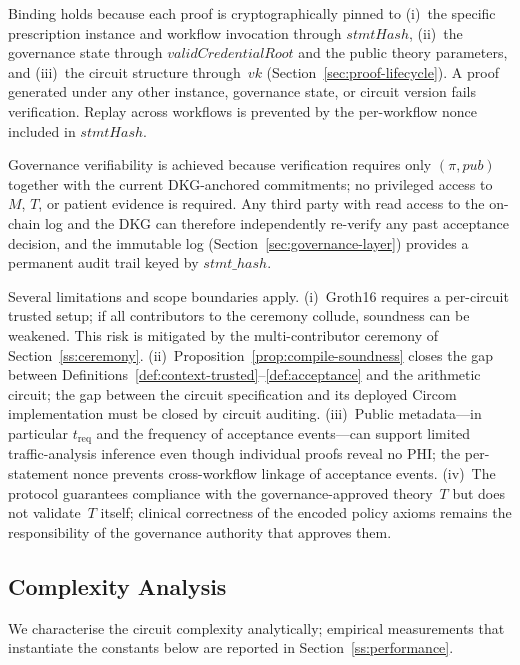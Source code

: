 \documentclass[journal]{IEEEtran}
\begin{document}
Binding holds because each proof is cryptographically pinned to
(i)~the specific prescription instance and workflow invocation
through $\mathit{stmtHash}$,
(ii)~the governance state through $\mathit{validCredentialRoot}$
and the public theory parameters, and
(iii)~the circuit structure through~$\mathit{vk}$
(Section~\ref{sec:proof-lifecycle}).
A proof generated under any other instance, governance state,
or circuit version fails verification.
Replay across workflows is prevented by the per-workflow
nonce included in $\mathit{stmtHash}$.

Governance verifiability is achieved because verification
requires only $(\pi, \mathit{pub})$ together
with the current DKG-anchored commitments; no privileged
access to~$M$, $T$, or patient evidence is required.
Any third party with read access to the on-chain log and the
DKG can therefore independently re-verify any past
acceptance decision, and the immutable log
(Section~\ref{sec:governance-layer}) provides a permanent
audit trail keyed by $\mathit{stmt\_hash}$.

Several limitations and scope boundaries apply.
(i)~Groth16 requires a per-circuit trusted setup; if all
contributors to the ceremony collude, soundness can be
weakened. This risk is mitigated by the multi-contributor
ceremony of Section~\ref{ss:ceremony}.
(ii)~Proposition~\ref{prop:compile-soundness} closes the gap
between Definitions~\ref{def:context-trusted}--\ref{def:acceptance}
and the arithmetic circuit; the gap between the circuit
specification and its deployed Circom implementation must be
closed by circuit auditing.
(iii)~Public metadata---in particular $t_{\mathrm{req}}$ and
the frequency of acceptance events---can support limited
traffic-analysis inference even though individual proofs
reveal no PHI; the per-statement nonce prevents cross-workflow
linkage of acceptance events.
(iv)~The protocol guarantees compliance with the
governance-approved theory~$T$ but does not validate~$T$
itself; clinical correctness of the encoded policy axioms
remains the responsibility of the governance authority that
approves them.


\subsection{Complexity Analysis}
\label{sec:complexity-analysis}

We characterise the circuit complexity analytically;
empirical measurements that instantiate the constants below
are reported in Section~\ref{ss:performance}.
\end{document}
